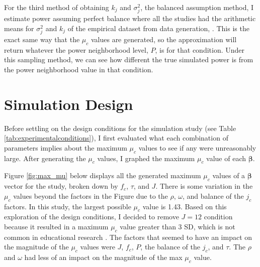 For the third method of obtaining $k_j$ and $\sigma_j^2$, the balanced assumption method, I estimate power assuming perfect balance where all the studies had the arithmetic means for $\sigma_j^2$ and $k_j$ of the empirical dataset from data generation, \textcite{WilliamsRyan2022HiMI}. This is the exact same way that the $\mu_c$ values are generated, so the approximation will return whatever the power neighborhood level, $P$,  is for that condition. Under this sampling method, we can see how different the true simulated power is from the power neighborhood value in that condition. 

\section{Simulation Design}\label{sec:simulationdesgin}

Before settling on the design conditions for the simulation study (see Table \ref{tab:experimentalconditions}), I first evaluated what each combination of parameters implies about the maximum $\mu_c$ values to see if any were unreasonably large. After generating the $\mu_c$ values, I graphed the maximum $\mu_c$ value of each $\bm{\beta}$.

Figure \ref{fig:max_mu} below displays all the generated maximum $\mu_c$ values of a $\bm{\beta}$ vector for the study, broken down by $f_c$, $\tau$, and $J$. There is some variation in the $\mu_c$ values beyond the factors in the Figure due to the $\rho$, $\omega$, and balance of the $j_c$ factors. In this study, the largest possible $\mu_c$ value is 1.43. Based on this exploration of the design conditions, I decided to remove $J=12$ condition because it resulted in a maximum $\mu_c$ value greater than 3 SD, which is not common in educational research \autocite{KraftMatthewA.2020IESo}.  The factors that seemed to have an impact on the magnitude of the $\mu_c$ values were $J$, $f_c$, $P$, the balance of the $j_c$, and $\tau$. The $\rho$ and $\omega$ had less of an impact on the magnitude of the max $\mu_c$ value. 



